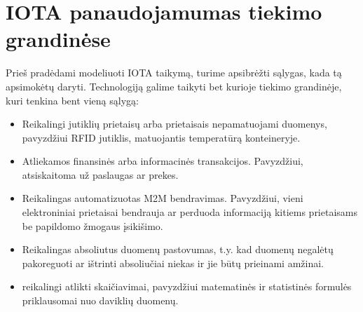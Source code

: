 \section{IOTA panaudojamumas tiekimo grandinėse}

Prieš pradėdami modeliuoti IOTA taikymą, turime apsibrėžti sąlygas, kada tą apsimokėtų daryti. Technologiją galime taikyti bet kurioje tiekimo grandinėje, kuri tenkina bent vieną sąlygą:

\begin{itemize}
    \item Reikalingi jutiklių prietaisų arba prietaisais nepamatuojami duomenys, pavyzdžiui RFID jutiklis, matuojantis temperatūrą konteineryje.
    \item Atliekamos finansinės arba informacinės transakcijos. Pavyzdžiui, atsiskaitoma už paslaugas ar prekes.
    \item Reikalingas automatizuotas M2M bendravimas. Pavyzdžiui, vieni elektroniniai prietaisai bendrauja ar perduoda informaciją kitiems prietaisams be papildomo žmogaus įsikišimo.
    \item Reikalingas absoliutus duomenų pastovumas, t.y. kad duomenų negalėtų pakoreguoti ar ištrinti absoliučiai niekas ir jie būtų prieinami amžinai.
    \item reikalingi atlikti skaičiavimai, pavyzdžiui matematinės ir statistinės formulės priklausomai nuo daviklių duomenų.
\end{itemize}

